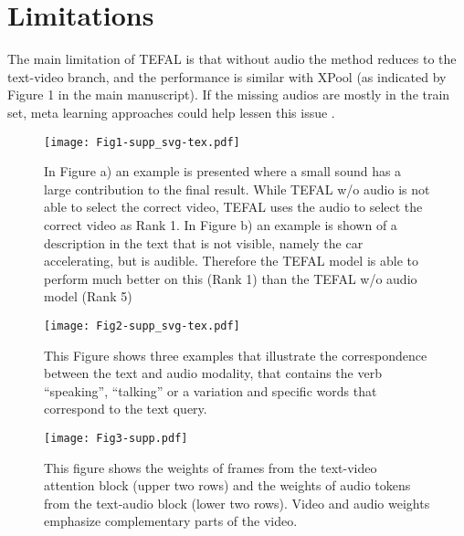 \documentclass[10pt,twocolumn,letterpaper]{article}
\begin{document}
\section{Limitations}
The main limitation of TEFAL is that without audio the method reduces to the text-video branch, and the performance is similar with XPool \cite{gorti2022xpool} (as indicated by Figure 1 in the main manuscript). If the missing audios are mostly in the train set, meta learning approaches could help lessen this issue \cite{ma2021smil}.


\begin{figure*}[t]
\texttt{[image: Fig1-supp\_svg-tex.pdf]}
\caption{In Figure a) an example is presented where a small sound has a large contribution to the final result. While TEFAL w/o audio is not able to select the correct video, TEFAL uses the audio to select the correct video as Rank 1. In Figure b) an example is shown of a description in the text that is not visible, namely the car accelerating, but is audible. Therefore the TEFAL model is able to perform much better on this (Rank 1) than the TEFAL w/o audio model (Rank 5)}
\label{fig:supp1}
\end{figure*}
     
     
\begin{figure*}[t]
\centering
   \texttt{[image: Fig2-supp\_svg-tex.pdf]}
     \caption{This Figure shows three examples that illustrate the correspondence between the text and audio modality, that contains the verb ``speaking'', ``talking'' or a variation and specific words that correspond to the text query.}
     \label{fig:supp2}
\end{figure*}


\begin{figure*}[t]
\centering
   \texttt{[image: Fig3-supp.pdf]}
     \caption{This figure shows the weights of frames from the text-video attention block (upper two rows) and the weights of audio tokens from the text-audio block (lower two rows). Video and audio weights emphasize complementary parts of the video. }
     \label{fig:supp3}
\end{figure*}
\end{document}
